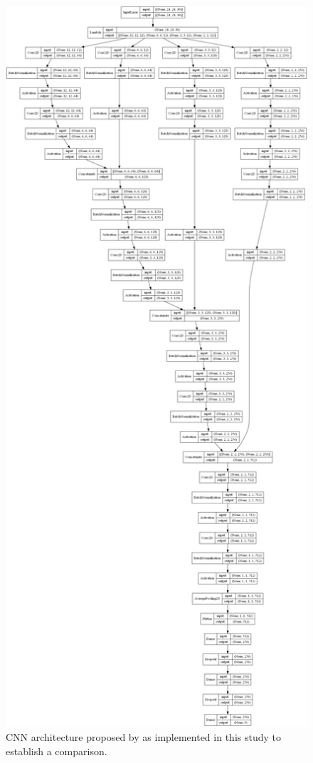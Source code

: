 \begin{figure}[bp]
    \centering
    \includegraphics[width=\linewidth]{figs/vineyard_classification/networks/spectral_net_24x23_64.png}
	\caption{CNN architecture proposed by \cite{chakraborty_spectralnet_2021} as implemented in this study to establish a comparison. }
	\label{fig:spectralnet_cnn}
\end{figure}

